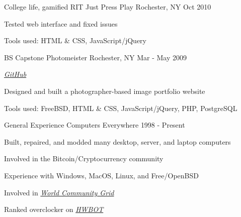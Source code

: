 \begin{cventries}
  \cventry
    {College life, gamified} %
    {RIT Just Press Play} %
    {Rochester, NY} %
    {Oct 2010} %
    {
      \begin{cvitems} %
        \item {Tested web interface and fixed issues}
        \item {Tools used: HTML \& CSS, JavaScript/jQuery}
      \end{cvitems}
    }


  \cventry
    {BS Capstone} %
    {Photomeister} %
    {Rochester, NY} %
    {Mar - May 2009} %
    {
      \begin{cvitems} %
        \item {\emph{\href{https://github.com/desnudopenguino/photomeister}{GitHub}}}
        \item {Designed and built a photographer-based image portfolio website}
        \item {Tools used: FreeBSD, HTML \& CSS, JavaScript/jQuery, PHP, PostgreSQL}
      \end{cvitems}
    }


  \cventry
    {General Experience} %
    {Computers} %
    {Everywhere} %
    {1998 - Present} %
    {
      \begin{cvitems} %
        \item {Built, repaired, and modded many desktop, server, and laptop computers}
        \item {Involved in the Bitcoin/Cryptocurrency community}
        \item {Experience with Windows, MacOS, Linux, and Free/OpenBSD}
        \item {Involved in \emph{\href{https://www.worldcommunitygrid.org/stats/viewMemberInfo.do?userName=desnudopenguino}{World Community Grid}}}
        \item {Ranked overclocker on \emph{\href{https://hwbot.org/user/desnudopenguino/}{HWBOT}}}
      \end{cvitems}
   }

\end{cventries}
